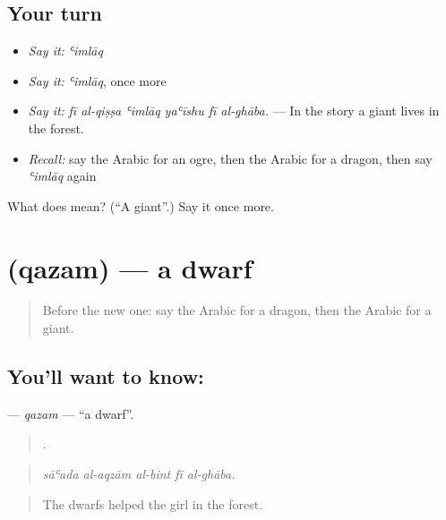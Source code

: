 \subsection*{Your turn}
\begin{itemize}
\raggedright
  \item \emph{Say it:} \emph{ʿimlāq}
  \item \emph{Say it:} \emph{ʿimlāq}, once more
  \item \emph{Say it:} \emph{fī al-qiṣṣa ʿimlāq yaʿīshu fī al-ghāba.} — In the story a giant lives in the forest.
  \item \emph{Recall:} say the Arabic for an ogre, then the Arabic for a dragon, then say \emph{ʿimlāq} again
\end{itemize}

\begin{tcolorbox}[breakable,colback=teal!4,colframe=teal!35!black,title={Before you move on}]
What does  mean? (\textquotedblleft{}A giant\textquotedblright{}.) Say it once more.
\end{tcolorbox}
\section[\texorpdfstring{\ar{قزم} (qazam)}{قزم (qazam)}]{ (qazam) — a dwarf}

\label{lesson:AR-C335-qazam}



\begin{quote}
Before the new one: say the Arabic for a dragon, then the Arabic for a giant.
\end{quote}

\subsection*{You'll want to know: }
\textbf{} — \emph{qazam} — \textquotedblleft{}a dwarf\textquotedblright{}.

\begin{quote}
    .
\end{quote}

\begin{quote}
\emph{sāʿada al-aqzām al-bint fī al-ghāba.}
\end{quote}

\begin{quote}
The dwarfs helped the girl in the forest.
\end{quote}

